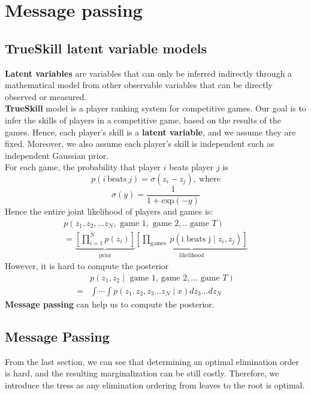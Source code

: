 \section{Message passing}
\label{sec:message-passing}
\subsection{TrueSkill latent variable models}
\textbf{Latent variables} are variables that can only be inferred indirectly through a mathematical model from other observable variables that can be directly observed or measured.\\
\newline
\textbf{TrueSkill} model is a player ranking system for competitive games. Our goal is to infer the skills of players in a competitive game, based on the results of the games. Hence, each player's skill is a \textbf{latent variable}, and we assume they are fixed. Moreover, we also assume each player's skill is independent such as independent Gaussian prior.\\
\newline
For each game, the probability that player $i$ beats player $j$ is
$$p(i\:\text{beats}\:j)=\sigma(z_i-z_j),\:\text{where}$$
$$\sigma{(y)}=\frac{1}{1+\text{exp}(-y)}$$
Hence the entire joint likelihood of players and games is:
\begin{gather*}
    p\left(z_1, z_2, \ldots z_N, \text { game } 1, \text { game } 2, . . \text { game } T\right) \\
    =\underbrace{\left[\prod_{i=1}^N p\left(z_i\right)\right]}_{\text{prior}} \underbrace{\left[\prod_{\text {games }} p\left(\mathrm{i} \text { beats } \mathrm{j} \mid z_i, z_j\right)\right]}_{\text{likelihood}}
\end{gather*}
However, it is hard to compute the posterior
\begin{align*}
    & p\left(z_1, z_2 \mid \text { game } 1 \text {, game } 2, \ldots \text { game } T\right) \\
    = & \int \cdots \int p\left(z_1, z_2, z_3 \ldots z_N \mid x\right) d z_3 \ldots d z_N
\end{align*}
\textbf{Message passing} can help us to compute the posterior.

\subsection{Message Passing}
From the last section, we can see that determining an optimal elimination order is hard, and the resulting marginalization can be still costly. Therefore, we introduce the tress as any elimination ordering from leaves to the root is optimal.
